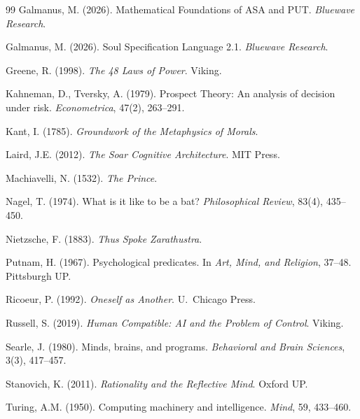 \documentclass[12pt,a4paper]{article}
\theoremstyle{plain}
\theoremstyle{definition}
\theoremstyle{remark}
\begin{document}
\begin{thebibliography}{99}
 Galmanus, M. (2026). Mathematical Foundations of ASA and PUT. \textit{Bluewave Research}.

 Galmanus, M. (2026). Soul Specification Language 2.1. \textit{Bluewave Research}.

 Greene, R. (1998). \textit{The 48 Laws of Power}. Viking.

 Kahneman, D., Tversky, A. (1979). Prospect Theory: An analysis of decision under risk. \textit{Econometrica}, 47(2), 263--291.

 Kant, I. (1785). \textit{Groundwork of the Metaphysics of Morals}.

 Laird, J.E. (2012). \textit{The Soar Cognitive Architecture}. MIT Press.

 Machiavelli, N. (1532). \textit{The Prince}.

 Nagel, T. (1974). What is it like to be a bat? \textit{Philosophical Review}, 83(4), 435--450.

 Nietzsche, F. (1883). \textit{Thus Spoke Zarathustra}.

 Putnam, H. (1967). Psychological predicates. In \textit{Art, Mind, and Religion}, 37--48. Pittsburgh UP.

 Ricoeur, P. (1992). \textit{Oneself as Another}. U.~Chicago Press.

 Russell, S. (2019). \textit{Human Compatible: AI and the Problem of Control}. Viking.

 Searle, J. (1980). Minds, brains, and programs. \textit{Behavioral and Brain Sciences}, 3(3), 417--457.

 Stanovich, K. (2011). \textit{Rationality and the Reflective Mind}. Oxford UP.

 Turing, A.M. (1950). Computing machinery and intelligence. \textit{Mind}, 59, 433--460.

\end{thebibliography}
\end{document}
